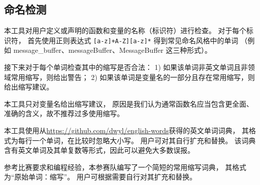 \subsection{命名检测}
\label{sec:core:naming}

本工具对用户定义或声明的函数和变量的名称（标识符）进行检查。
对于每个标识符，
首先使用正则表达式 \texttt{{[}a-z{]}+\textbar{}{[}A-Z{]}{[}a-z{]}*} 
得到常见命名风格中的单词
（例如 message\_buffer、messageBuffer、MessageBuffer 这三种形式）。

接下来对于每个单词检查其中的缩写是否合法：
1) 如果该单词非英文单词且非领域常用缩写，则给出警告；
2) 如果该单词是变量名的一部分且存在常用缩写，则给出缩写建议。

本工具只对变量名给出缩写建议，
原因是我们认为通常函数名应当包含更全面、准确的含义，故不推荐过多使用缩写。

本工具使用从\url{https://github.com/dwyl/english-words}获得的英文单词词典，
其格式为每行一个单词，在比较时忽略大小写。
用户可对其自行扩充和替换。
该词典含有英文单词及其单复数等形式，因此可以避免大多数误报。

参考比赛要求和编程经验，本参赛队编写了一个简短的常用缩写词典，
其格式为``原始单词：缩写''。
用户可根据需要自行对其扩充和替换。
